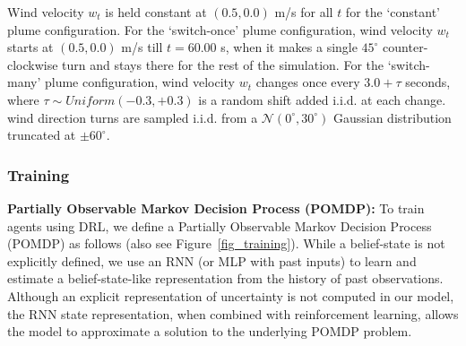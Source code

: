 \documentclass[5p,twocolumn,authoryear]{elsarticle}
\begin{document}
Wind velocity $w_t$ is held constant at $(0.5, 0.0)$ m/s for all $t$ for the `constant' plume configuration.
For the `switch-once' plume configuration, wind velocity $w_t$ starts at $(0.5, 0.0)$ m/s till $t=60.00$ s, when it makes a single $45^{\circ}$ counter-clockwise turn and stays there for the rest of the simulation.
For the `switch-many' plume configuration, wind velocity $w_t$ changes once every $3.0 + \tau$ seconds, where $\tau \sim Uniform(-0.3, +0.3)$ is a random shift added i.i.d. at each change.
wind direction turns are sampled i.i.d. from a $\mathcal{N}(0^{\circ}, 30^{\circ})$ Gaussian distribution truncated at $\pm60^{\circ}$.

\noindent \subsubsection{Training}

\textbf{Partially Observable Markov Decision Process (POMDP):} 
To train agents using DRL, we define a Partially Observable Markov Decision Process (POMDP) \citep{sutton2018reinforcement} as follows (also see Figure~\ref{fig_training}). 
While a belief-state is not explicitly defined, we use an RNN (or MLP with past inputs) to learn and estimate a belief-state-like representation from the history of past observations. 
Although an explicit representation of uncertainty is not computed in our model,  the RNN state representation, when combined with reinforcement learning, allows the model to approximate a solution to the underlying POMDP problem.
\end{document}
